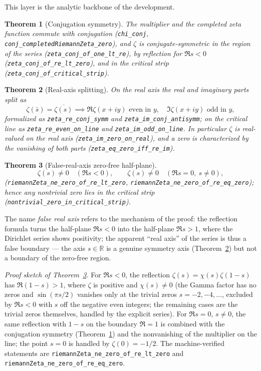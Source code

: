 \documentclass{article}
\newtheorem{theorem}{Theorem}[section]
\newcommand{\R}{\mathbb{R}}
\newcommand{\zt}{\zeta}
\newcommand{\Xchi}{\chi}
\begin{document}
This layer is the analytic backbone of the development.

\begin{theorem}[Conjugation symmetry]
\label{thm:conj}
The multiplier and the completed zeta function commute with conjugation
(\texttt{chi\_conj}, \texttt{conj\_completedRiemannZeta\_zero}), and $\zt$
is conjugate-symmetric in the region of the series
(\texttt{zeta\_conj\_of\_one\_lt\_re}), by reflection for $\Re s<0$
(\texttt{zeta\_conj\_of\_re\_lt\_zero}), and in the critical strip
(\texttt{zeta\_conj\_of\_critical\_strip}).
\end{theorem}

\begin{theorem}[Real-axis splitting]
\label{thm:realaxis}
On the real axis the real and imaginary parts split as
\[
\zt(\bar s)=\overline{\zt(s)}
\implies
\Re\zt(x+iy)\text{ even in }y,\quad \Im\zt(x+iy)\text{ odd in }y,
\]
formalized as \texttt{zeta\_re\_conj\_symm} and
\texttt{zeta\_im\_conj\_antisymm}; on the critical line as
\texttt{zeta\_re\_even\_on\_line} and \texttt{zeta\_im\_odd\_on\_line}. In
particular $\zt$ is real-valued on the real axis
(\texttt{zeta\_im\_zero\_on\_real}), and a zero is characterized by the
vanishing of both parts (\texttt{zeta\_eq\_zero\_iff\_re\_im}).
\end{theorem}

\begin{theorem}[False-real-axis zero-free half-plane]
\label{thm:falseaxis}
\begin{equation}
\label{eq:false}
\zt(s)\neq 0\quad(\Re s<0),\qquad \zt(s)\neq 0\quad(\Re s=0,\ s\neq 0),
\end{equation}
(\texttt{riemannZeta\_ne\_zero\_of\_re\_lt\_zero},
\texttt{riemannZeta\_ne\_zero\_of\_re\_eq\_zero}); hence any nontrivial zero
lies in the critical strip (\texttt{nontrivial\_zero\_in\_critical\_strip}).
\end{theorem}

The name \emph{false real axis} refers to the mechanism of the proof: the
reflection formula turns the half-plane $\Re s<0$ into the half-plane
$\Re s>1$, where the Dirichlet series shows positivity; the apparent ``real
axis'' of the series is thus a false boundary --- the axis $s\in\R$ is a
genuine symmetry axis (Theorem~\ref{thm:realaxis}) but not a boundary of the
zero-free region.

\emph{Proof sketch of Theorem~\ref{thm:falseaxis}.} For $\Re s<0$, the
reflection $\zt(s)=\Xchi(s)\zt(1-s)$ has $\Re(1-s)>1$, where $\zt$ is
positive and $\Xchi(s)\neq 0$ (the Gamma factor has no zeros and
$\sin(\pi s/2)$ vanishes only at the trivial zeros $s=-2,-4,\dots$, excluded
by $\Re s<0$ with $s$ off the negative even integers; the remaining cases
are the trivial zeros themselves, handled by the explicit series). For
$\Re s=0$, $s\neq 0$, the same reflection with $1-s$ on the boundary
$\Re=1$ is combined with the conjugation symmetry
(Theorem~\ref{thm:conj}) and the nonvanishing of the multiplier on the
line; the point $s=0$ is handled by $\zt(0)=-1/2$. The machine-verified
statements are \texttt{riemannZeta\_ne\_zero\_of\_re\_lt\_zero} and
\texttt{riemannZeta\_ne\_zero\_of\_re\_eq\_zero}.
\end{document}
